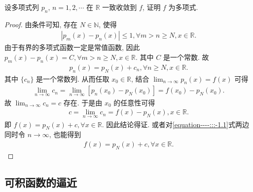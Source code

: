 \documentclass[../../main.tex]{subfiles}
\begin{document}
\begin{example}
设多项式列 $p_n$, $n = 1,2,\cdots$ 在 $\mathbb{R}$ 一致收敛到 $f$, 证明 $f$ 为多项式. 
\end{example}
\begin{proof}
由条件可知, 存在 $N\in \mathbb{N}$, 使得
\begin{align*}
|p_m(x) - p_n(x)| \leqslant 1, \forall m > n \geqslant N, x\in \mathbb{R}.
\end{align*}
由于有界的多项式函数一定是常值函数, 因此 $p_m(x) - p_n(x) = C, \forall m > n \geqslant N, x\in \mathbb{R}$. 其中 $C$ 是一个常数. 故
\begin{align}
p_n(x) = p_N(x) + c_n, \forall n \geqslant N, x\in \mathbb{R}. \label{equation----:::-1.1}
\end{align}
其中 $\{c_n\}$ 是一个常数列. 从而任取 $x_0\in \mathbb{R}$, 结合 $\lim_{n\rightarrow \infty}p_n(x) = f(x)$ 可得
\begin{align*}
\lim_{n\rightarrow \infty}c_n = \lim_{n\rightarrow \infty}[p_n(x_0) - p_N(x_0)] = f(x_0) - p_N(x_0).
\end{align*}
故 $\lim_{n\rightarrow \infty}c_n = c$ 存在. 于是由 $x_0$ 的任意性可得
\begin{align*}
c = \lim_{n\rightarrow \infty}c_n = f(x) - p_N(x), x\in \mathbb{R}.
\end{align*}
即 $f(x) = p_N(x) + c, \forall x\in \mathbb{R}$. 因此结论得证.
或者对\eqref{equation----:::-1.1}式两边同时令 $n\rightarrow \infty$, 也能得到
\begin{align*}
f(x) = p_N(x) + c, \forall x\in \mathbb{R}.
\end{align*} 
\end{proof}

\subsection{可积函数的逼近}
\end{document}
